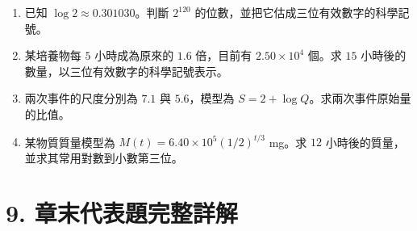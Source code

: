 \documentclass[11pt,a4paper]{article}
\providecommand{\tightlist}{%
  \setlength{\itemsep}{0pt}\setlength{\parskip}{0pt}}
\begin{document}
\begin{enumerate}
\def\labelenumi{\arabic{enumi}.}
\setcounter{enumi}{12}
\tightlist
\item
  已知 \(\log2\approx0.301030\)。判斷 \(2^{120}\) 的位數，並把它估成三位有效數字的科學記號。
\item
  某培養物每 \(5\) 小時成為原來的 \(1.6\) 倍，目前有 \(2.50\times10^4\) 個。求 \(15\) 小時後的數量，以三位有效數字的科學記號表示。
\item
  兩次事件的尺度分別為 \(7.1\) 與 \(5.6\)，模型為 \(S=2+\log Q\)。求兩次事件原始量的比值。
\item
  某物質質量模型為 \(M(t)=6.40\times10^5(1/2)^{t/3}\) mg。求 \(12\) 小時後的質量，並求其常用對數到小數第三位。
\end{enumerate}

\section{9. 章末代表題完整詳解}\label{ux7ae0ux672bux4ee3ux8868ux984cux5b8cux6574ux8a73ux89e3}
\end{document}
